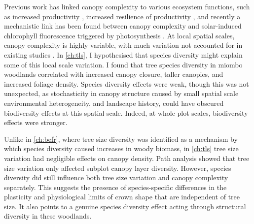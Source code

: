 \begin{refsection}
Previous work has linked canopy complexity to various ecosystem functions, such as increased productivity \citep{Gough2019, Hardiman2011}, increased resilience of productivity \citep{Pretzsch2014}, and recently a mechanistic link has been found between canopy complexity and solar-induced chlorophyll fluorescence triggered by photosynthesis \citep{Regaieg2021}. At local spatial scales, canopy complexity is highly variable, with much variation not accounted for in existing studies \citep{Guan2014}. In \autoref{ch:tls}, I hypothesised that species diversity might explain some of this local scale variation. I found that tree species diversity in miombo woodlands correlated with increased canopy closure, taller canopies, and increased foliage density. Species diversity effects were weak, though this was not unexpected, as stochasticity in canopy structure caused by small spatial scale environmental heterogeneity, and landscape history, could have obscured biodiversity effects at this spatial scale. Indeed, at whole plot scales, biodiversity effects were stronger.

Unlike in \autoref{ch:befr}, where tree size diversity was identified as a mechanism by which species diversity caused increases in woody biomass, in \autoref{ch:tls} tree size variation had negligible effects on canopy density. Path analysis showed that tree size variation only affected subplot canopy layer diversity. However, species diversity did still influence both tree size variation and canopy complexity separately. This suggests the presence of species-specific differences in the plasticity and physiological limits of crown shape that are independent of tree size. It also points to a genuine species diversity effect acting through structural diversity in these woodlands.


\end{refsection}
